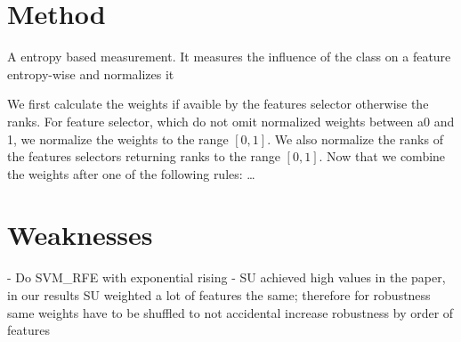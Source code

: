 \documentclass[twoside,11pt]{article}
\begin{document}
\section{Method}
A entropy based measurement. It measures the influence of the class on a feature entropy-wise and normalizes it

We first calculate the weights if avaible by the features selector otherwise the ranks.
For feature selector, which do not omit normalized weights between a0 and 1, we normalize
the weights to the range $[0,1]$. We also normalize the ranks of the features selectors returning
ranks to the range $[0,1]$. Now that we combine the weights after one of the following rules: \ldots

\section{Weaknesses}
- Do SVM\_RFE with exponential rising
- SU achieved high values in the paper, in our results SU weighted a lot of features the 
same; therefore for robustness same weights have to be shuffled to not accidental increase
robustness by order of features



\newpage

\appendix


\vskip 0.2in

\end{document}

